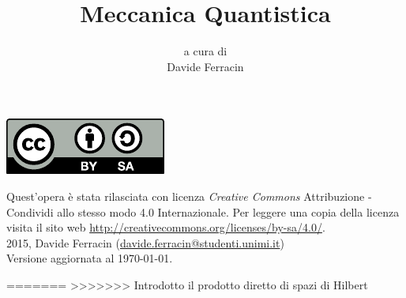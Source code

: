 \documentclass[a4paper,oneside]{book}
\title{
	{\sffamily\fontsize{35}{42}\selectfont Meccanica Quantistica}
}
\author{
	{\small a cura di}\\
	Davide Ferracin
}
\date{}
\begin{document}
\frontmatter
\maketitle

\null %
\vfill %
\hspace*{-1.5em}\includegraphics[scale=.7]{by-sa-icon.pdf}
\begin{flushleft}
	Quest'opera è stata rilasciata con licenza \emph{Creative Commons} Attribuzione - Condividi allo stesso modo 4.0 Internazionale. Per leggere una copia della licenza visita il sito web \url{http://creativecommons.org/licenses/by-sa/4.0/}.\\
	2015, Davide Ferracin (\href{mailto:davide.ferracin@studenti.unimi.it}{\ttfamily davide.ferracin@studenti.unimi.it})\\[1cm]
	Versione aggiornata al \today.
\end{flushleft}

\mainmatter













\backmatter

\cleardoublepage
{}
{}
\nocite{*}
\printbibliography
=======
>>>>>>> Introdotto il prodotto diretto di spazi di Hilbert

\cleardoublepage
{}
\tableofcontents
\end{document}
